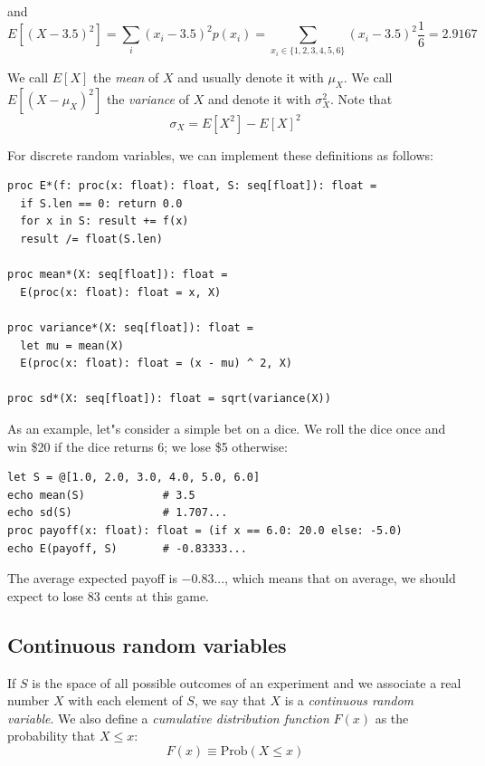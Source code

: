 \documentclass[justified, sixbynine]{tufte-book}
\def\ft{\small\tt}
\theoremstyle{plain}%
\newtheorem * {corollary}{Corollary}
\theoremstyle{definition}
\theoremstyle{remark}
\newtheorem * {remark}{Remark}
\newtheorem * {note}{Note}
\begin{document}
\begin{fullwidth}
and
\begin{equation}
E[(X-3.5)^2]=\sum_i(x_i-3.5)^2p(x_i)=\sum_{x_i\in
\{1, 2, 3, 4, 5, 6\}}(x_i-3.5)^2\frac 16=2.9167
\end{equation}

We call $E[X]$ the {\it mean} of $X$ and usually denote it with $\mu _X$.
We call $E[(X-\mu _X)^2]$ the {\it variance} of $X$ and denote it with $\sigma _X^2$. Note that
\begin{equation}
\sigma _X=E[X^2]-E[X]^2
\end{equation}

For discrete random variables, we can implement these definitions as follows:

\begin{lstlisting}[caption={in file: {\ft nlib/stats.nim}}]
proc E*(f: proc(x: float): float, S: seq[float]): float =
  if S.len == 0: return 0.0
  for x in S: result += f(x)
  result /= float(S.len)

proc mean*(X: seq[float]): float =
  E(proc(x: float): float = x, X)

proc variance*(X: seq[float]): float =
  let mu = mean(X)
  E(proc(x: float): float = (x - mu) ^ 2, X)

proc sd*(X: seq[float]): float = sqrt(variance(X))
\end{lstlisting}

As an example, let"s consider a simple bet on a dice. We roll the dice once and win \$20 if the dice returns 6; we lose \$5 otherwise:

\begin{lstlisting}
let S = @[1.0, 2.0, 3.0, 4.0, 5.0, 6.0]
echo mean(S)            # 3.5
echo sd(S)              # 1.707...
proc payoff(x: float): float = (if x == 6.0: 20.0 else: -5.0)
echo E(payoff, S)       # -0.83333...
\end{lstlisting}

The average expected payoff is $-0.83...$, which means that on average, we should expect to lose 83 cents at this game.

\goodbreak\subsection{Continuous random variables}

If $S$ is the space of all possible outcomes of an experiment and we
associate a real number $X$ with each element of $S$, we say that $X$ is a {\it %
continuous random variable}. We also define a {\it cumulative distribution
function} $F(x)$ as the probability that $X\leq x$:
\begin{equation}
F(x)\equiv \textrm{Prob}(X\leq x)
\end{equation}


\end{fullwidth}
\end{document}
